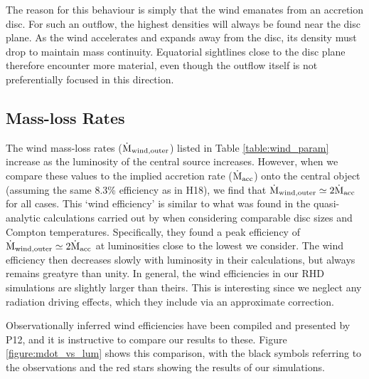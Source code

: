 \documentclass[a4paper,fleqn,usenatbib]{mnras}
\begin{document}
The reason for this behaviour is simply that the wind emanates from
an accretion disc. For such an outflow, the highest densities will
always be found near the disc plane. As the wind accelerates and
expands away from the disc, its density must drop to maintain mass
continuity. Equatorial sightlines close to the disc plane therefore
encounter more material, even though the outflow itself is not
preferentially focused in this direction.

\subsection{Mass-loss Rates}

The wind mass-loss rates ($\dot{\rm{M}}_{\rm{wind,outer}}$) listed in
Table \ref{table:wind_param}   
increase as the luminosity of the central source increases. However,
when we compare these values to the implied 
accretion rate ($\dot{\rm{M}}_{\rm{acc}}$) onto the central object
(assuming the same 8.3\% efficiency as in H18), we find that
$\dot{\rm{M}}_{\rm{wind,outer}}\simeq2\dot{\rm{M}}_{\rm{acc}}$ for all cases.
This `wind efficiency' is similar to what was found in the
quasi-analytic calculations carried out by
\cite{2018MNRAS.473..838D} when considering comparable disc sizes and
Compton temperatures. Specifically, they found a peak efficiency of
$\dot{\rm{M}}_{\rm{wind,outer}}\simeq2\dot{\rm{M}}_{\rm{acc}}$ at
luminosities close to the lowest we consider. The wind efficiency then 
decreases slowly with luminosity in their calculations, but always
remains greatyre than unity. In general, the wind efficiencies in our
RHD simulations are slightly larger than theirs. This is interesting since
we neglect any radiation driving effects, which they include via an
approximate correction.

Observationally inferred wind efficiencies have been compiled and
presented by P12, and it is instructive to
compare our results to these. Figure \ref{figure:mdot_vs_lum} shows 
this comparison, with the black symbols referring to the observations
and the red stars showing the results of our simulations. 
\end{document}
